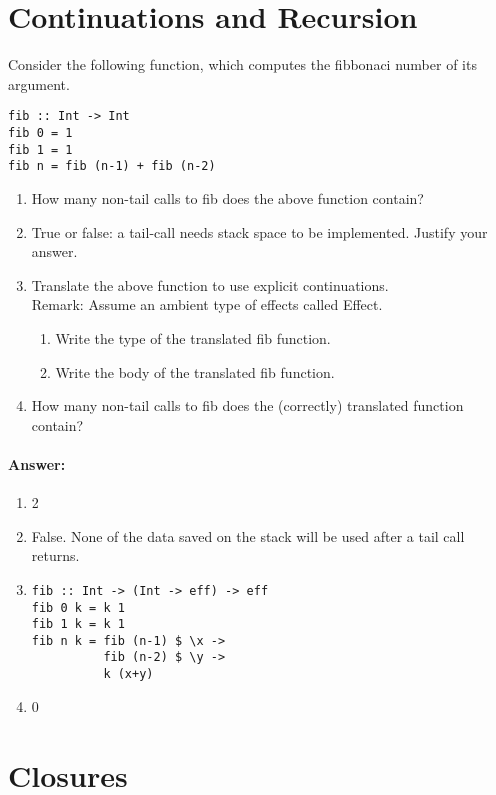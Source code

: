 \documentclass{article}
\newcommand{\answer}[0]{\paragraph{Answer:}}
\begin{document}
\section{Continuations and Recursion}

Consider the following function, which computes the fibbonaci number
of its argument.
\begin{verbatim}
fib :: Int -> Int
fib 0 = 1
fib 1 = 1
fib n = fib (n-1) + fib (n-2)
\end{verbatim}

\begin{enumerate}
\item How many non-tail calls to fib does the above function contain?
\item True or false: a tail-call needs stack space to be
  implemented. Justify your answer. 
\item Translate the above function to use explicit continuations.
  \\ Remark: Assume an ambient type of effects called Effect.
  \begin{enumerate}
  \item  Write the type of the translated fib function. 
  \item  Write the body of the translated fib function. 
  \end{enumerate}
\item How many non-tail calls to fib does the (correctly) translated function
  contain? 
\end{enumerate}

\answer{
  \begin{enumerate}
  \item 2
  \item False. None of the data saved on the stack will be used after a tail call returns.
  \item 
\begin{verbatim}
fib :: Int -> (Int -> eff) -> eff
fib 0 k = k 1
fib 1 k = k 1
fib n k = fib (n-1) $ \x ->
          fib (n-2) $ \y ->
          k (x+y)
\end{verbatim}
\item 0
  \end{enumerate}
}

\newpage
\section{Closures}
\end{document}
